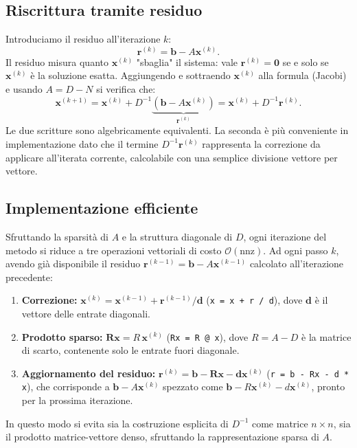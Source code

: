 \documentclass[a4paper, 12pt]{report}
\begin{document}
\subsection*{Riscrittura tramite residuo}

Introduciamo il residuo all'iterazione $k$:
\[
    \mathbf{r}^{(k)} = \mathbf{b} - A\mathbf{x}^{(k)}.
\]
Il residuo misura quanto $\mathbf{x}^{(k)}$ "sbaglia" il sistema: vale
$\mathbf{r}^{(k)} = \mathbf{0}$ se e solo se $\mathbf{x}^{(k)}$ è la
soluzione esatta. Aggiungendo e sottraendo $\mathbf{x}^{(k)}$ alla formula
(Jacobi) e usando $A = D - N$ si verifica che:
\[
    \mathbf{x}^{(k+1)}
    = \mathbf{x}^{(k)} + D^{-1}\underbrace{\left(\mathbf{b} -
    A\mathbf{x}^{(k)}\right)}_{\mathbf{r}^{(k)}}
    = \mathbf{x}^{(k)} + D^{-1}\mathbf{r}^{(k)}.
\]
Le due scritture sono algebricamente equivalenti. La seconda è più
conveniente in implementazione dato che il termine $D^{-1}\mathbf{r}^{(k)}$
rappresenta la correzione da applicare all'iterata corrente,
calcolabile con una semplice divisione vettore per vettore.

\subsection*{Implementazione efficiente}

Sfruttando la sparsità di $A$ e la struttura diagonale di $D$, ogni
iterazione del metodo si riduce a tre operazioni vettoriali di costo
$\mathcal{O}(\mathrm{nnz})$. Ad ogni passo $k$, avendo già disponibile
il residuo $\mathbf{r}^{(k-1)} = \mathbf{b} - A\mathbf{x}^{(k-1)}$
calcolato all'iterazione precedente:
\begin{enumerate}
    \item \textbf{Correzione:}
          $\mathbf{x}^{(k)} = \mathbf{x}^{(k-1)} + \mathbf{r}^{(k-1)}
          \slash \mathbf{d}$\quad
          (\texttt{x = x + r / d}),
          dove $\mathbf{d}$ è il vettore delle entrate diagonali.
    \item \textbf{Prodotto sparso:}
          $\mathbf{Rx} = R\,\mathbf{x}^{(k)}$\quad
          (\texttt{Rx = R @ x}),
          dove $R = A - D$ è la matrice di scarto, contenente solo le
          entrate fuori diagonale.
    \item \textbf{Aggiornamento del residuo:}
          $\mathbf{r}^{(k)} = \mathbf{b} - \mathbf{Rx} -
          \mathbf{d}\mathbf{x}^{(k)}$\quad
          (\texttt{r = b - Rx - d * x}),
          che corrisponde a $\mathbf{b} - A\mathbf{x}^{(k)}$ spezzato
          come $\mathbf{b} - R\mathbf{x}^{(k)} - d\mathbf{x}^{(k)}$,
          pronto per la prossima iterazione.
\end{enumerate}
In questo modo si evita sia la costruzione esplicita di $D^{-1}$ come
matrice $n \times n$, sia il prodotto matrice-vettore denso, sfruttando
la rappresentazione sparsa di $A$.
\end{document}
